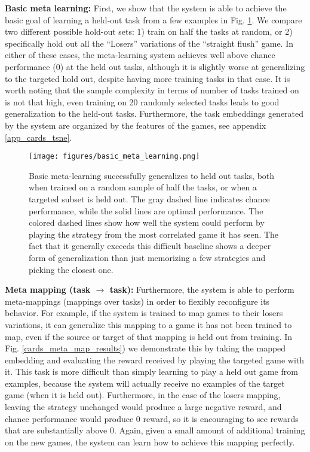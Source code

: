 \documentclass{article}
\begin{document}
\textbf{Basic meta learning:} First, we show that the system is able to achieve the basic goal of learning a held-out task from a few examples in Fig. \ref{cards_basic_results}. We compare two different possible hold-out sets: 1) train on half the tasks at random, or 2) specifically hold out all the ``Losers'' variations of the ``straight flush'' game. In either of these cases, the meta-learning system achieves well above chance performance (0) at the held out tasks, although it is slightly worse at generalizing to the targeted hold out, despite having more training tasks in that case. It is worth noting that the sample complexity in terms of number of tasks trained on is not that high, even training on 20 randomly selected tasks leads to good generalization to the held-out tasks. Furthermore, the task embeddings generated by the system are organized by the features of the games, see appendix \ref{app_cards_tsne}.\par
\begin{figure}
\centering
\texttt{[image: figures/basic\_meta\_learning.png]}
\caption{Basic meta-learning successfully generalizes to held out tasks, both when trained on a random sample of half the tasks, or when a targeted subset is held out. The gray dashed line indicates chance performance, while the solid lines are optimal performance. The colored dashed lines show how well the system could perform by playing the strategy from the most correlated game it has seen. The fact that it generally exceeds this difficult baseline shows a deeper form of generalization than just memorizing a few strategies and picking the closest one.}
\label{cards_basic_results}
\end{figure}
\textbf{Meta mapping (task $\rightarrow$ task):} Furthermore, the system is able to perform meta-mappings (mappings over tasks) in order to flexibly reconfigure its behavior. For example, if the system is trained to map games to their losers variations, it can generalize this mapping to a game it has not been trained to map, even if the source or target of that mapping is held out from training. In Fig. \ref{cards_meta_map_results}) we demonstrate this by taking the mapped embedding and evaluating the reward received by playing the targeted game with it. This task is more difficult than simply learning to play a held out game from examples, because the system will actually receive no examples of the target game (when it is held out). Furthermore, in the case of the losers mapping, leaving the strategy unchanged would produce a large negative reward, and chance performance would produce 0 reward, so it is encouraging to see rewards that are substantially above 0. Again, given a small amount of additional training on the new games, the system can learn how to achieve this mapping perfectly. \par
\end{document}
